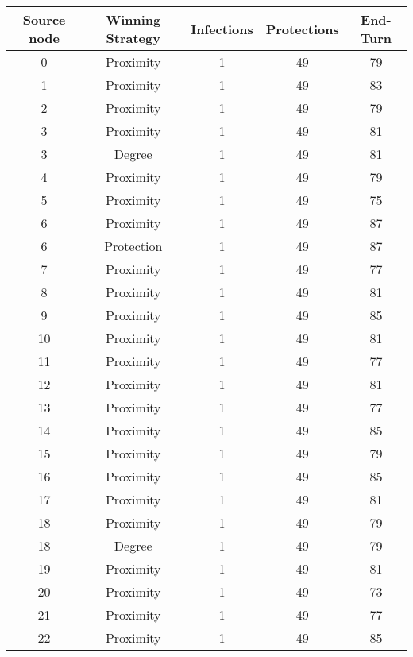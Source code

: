 \documentclass[results.tex]{subfiles}
\begin{document}
\begin{center}
  \begin{tabular}{| c || c | c | c | c |}
    \hline
    {\bfseries Source node} & {\bfseries Winning Strategy} & {\bfseries Infections} & {\bfseries Protections} & {\bfseries End-Turn} \\  %
    \hline\hline
    0 & Proximity & 1 & 49 & 79 \\ 
    \hline
    1 & Proximity & 1 & 49 & 83 \\ 
    \hline
    2 & Proximity & 1 & 49 & 79 \\ 
    \hline
    3 & Proximity & 1 & 49 & 81 \\ 
    \hline
    3 & Degree & 1 & 49 & 81 \\ 
    \hline
    4 & Proximity & 1 & 49 & 79 \\ 
    \hline
    5 & Proximity & 1 & 49 & 75 \\ 
    \hline
    6 & Proximity & 1 & 49 & 87 \\ 
    \hline
    6 & Protection & 1 & 49 & 87 \\ 
    \hline
    7 & Proximity & 1 & 49 & 77 \\ 
    \hline
    8 & Proximity & 1 & 49 & 81 \\ 
    \hline
    9 & Proximity & 1 & 49 & 85 \\ 
    \hline
    10 & Proximity & 1 & 49 & 81 \\ 
    \hline
    11 & Proximity & 1 & 49 & 77 \\ 
    \hline
    12 & Proximity & 1 & 49 & 81 \\ 
    \hline
    13 & Proximity & 1 & 49 & 77 \\ 
    \hline
    14 & Proximity & 1 & 49 & 85 \\ 
    \hline
    15 & Proximity & 1 & 49 & 79 \\ 
    \hline
    16 & Proximity & 1 & 49 & 85 \\ 
    \hline
    17 & Proximity & 1 & 49 & 81 \\ 
    \hline
    18 & Proximity & 1 & 49 & 79 \\ 
    \hline
    18 & Degree & 1 & 49 & 79 \\ 
    \hline
    19 & Proximity & 1 & 49 & 81 \\ 
    \hline
    20 & Proximity & 1 & 49 & 73 \\ 
    \hline
    21 & Proximity & 1 & 49 & 77 \\ 
    \hline
    22 & Proximity & 1 & 49 & 85 \\ 

\end{tabular}
\end{center}
\end{document}
